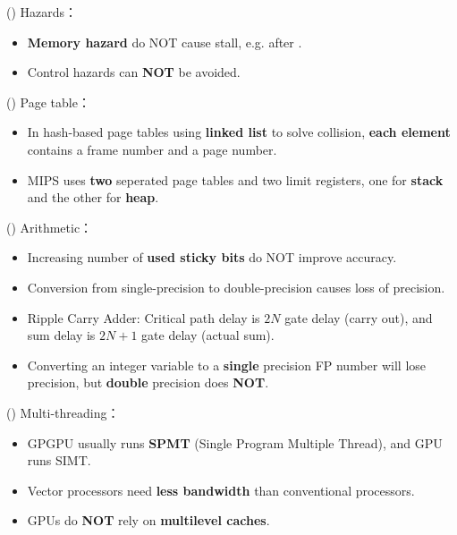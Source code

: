 \item \begin{theorem}{()} Hazards： \begin{itemize}
        \item \textbf{Memory hazard} do NOT cause stall, e.g.  after .
        \item Control hazards can \textbf{NOT} be avoided.
    \end{itemize}
\end{theorem}

\item \begin{theorem}{()} Page table： \begin{itemize}
        \item In hash-based page tables using \textbf{linked list} to solve collision, \textbf{each element} contains a frame number and a page number.
        \item MIPS uses \textbf{two} seperated page tables and two limit registers, one for \textbf{stack} and the other for \textbf{heap}.
    \end{itemize}
\end{theorem}

\item \begin{theorem}{()} Arithmetic： \begin{itemize}
        \item Increasing number of \textbf{used sticky bits} do NOT improve accuracy.
        \item Conversion from single-precision to double-precision causes loss of precision.
        \item Ripple Carry Adder: Critical path delay is $2N$ gate delay (carry out), and sum delay is $2N + 1$ gate delay (actual sum).
        \item Converting an integer variable to a \textbf{single} precision FP number will lose precision, but \textbf{double} precision does \textbf{NOT}.
    \end{itemize}
\end{theorem}

\item \begin{theorem}{()} Multi-threading： \begin{itemize}
        \item GPGPU usually runs \textbf{SPMT} (Single Program Multiple Thread), and GPU runs SIMT.
        \item Vector processors need \textbf{less bandwidth} than conventional processors.
        \item GPUs do \textbf{NOT} rely on \textbf{multilevel caches}.
    \end{itemize}
\end{theorem}

